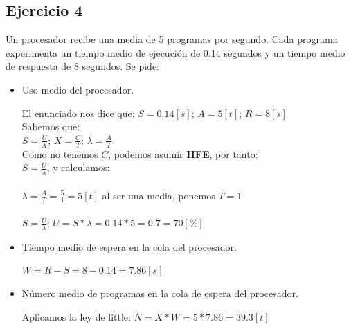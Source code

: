 \subsection{Ejercicio 4}
Un procesador recibe una media de 5 programas por segundo. Cada programa experimenta un tiempo medio de ejecución de 0.14 segundos y un tiempo medio de respuesta de 8 segundos. Se pide:
\begin{itemize}
    \item Uso medio del procesador.
    \begin{tcolorbox}[colback=white,colframe=cyan!50!black,fonttitle=\bfseries]
    El enunciado nos dice que: $S=0.14[s]$; $A=5[t]$; $R=8[s]$\\
    Sabemos que: \\
    $S =\frac{U}{X}$;  $X = \frac{C}{T}$; $\lambda = \frac{A}{T}$\\
    Como no tenemos $C$, podemos asumir \textbf{HFE}, por tanto:\\
    $S =\frac{U}{\lambda}$, y calculamos:\\\\
    $\lambda = \frac{A}{T} = \frac{5}{1} = 5[t]$ al ser una media, ponemos $T=1$\\\\
    $S =\frac{U}{\lambda}$; $U = S * \lambda = 0.14*5=0.7=70[\%]$ 
    \end{tcolorbox}
    \item Tiempo medio de espera en la cola del procesador.
    \begin{tcolorbox}[colback=white,colframe=cyan!50!black,fonttitle=\bfseries]
    $W = R-S= 8-0.14 = 7.86[s]$
    \end{tcolorbox}
    \item Número medio de programas en la cola de espera del procesador.
    \begin{tcolorbox}[colback=white,colframe=cyan!50!black,fonttitle=\bfseries]
    Aplicamos la ley de little:
    $N=X*W=5*7.86=39.3[t]$
    \end{tcolorbox}
\end{itemize}

